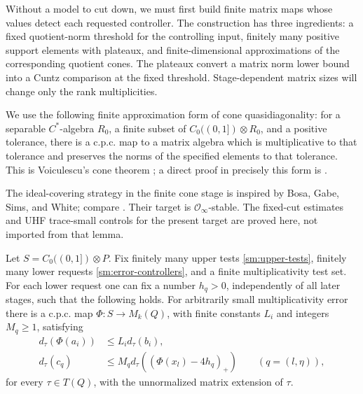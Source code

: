 Without a model to cut down, we must first build finite matrix maps
whose values detect each requested controller.  The construction has
three ingredients: a fixed quotient-norm threshold for the controlling
input, finitely many positive support elements with plateaux, and
finite-dimensional approximations of the corresponding quotient cones.
The plateaux convert a matrix norm lower bound into a Cuntz comparison
at the fixed threshold.  Stage-dependent matrix sizes will change only
the rank multiplicities.

We use the following finite approximation form of cone
quasidiagonality: for a separable \(C^*\)-algebra \(R_0\), a finite
subset of \(C_0((0,1])\otimes R_0\), and a positive tolerance,
there is a c.p.c. map to a matrix algebra which is
multiplicative to that tolerance and preserves the norms of
the specified elements to that tolerance.  This is
Voiculescu's cone theorem \cite{Voiculescu}; a direct proof in precisely this
form is \cite[Proposition~33]{Shulman}.

The ideal-covering strategy in the finite cone stage is inspired by
Bosa, Gabe, Sims, and White; compare \cite[Lemma~3.5]{BGSW}.
Their target is \(\mathcal O_\infty\)-stable.  The fixed-cut estimates
and UHF trace-small controls for the present target are proved here,
not imported from that lemma.

\begin{lemma}\label{sm:cone-stage}
Let \(S=C_0((0,1])\otimes P\).  Fix finitely many upper
tests \eqref{sm:upper-tests}, finitely many lower requests
\eqref{sm:error-controllers}, and a finite multiplicativity
test set.  For each lower request one can fix a number
\(h_q>0\), independently of all later stages, such that the
following holds.
For arbitrarily small multiplicativity error there is a
c.p.c. map \(\Phi:S\to M_k(Q)\), with finite constants
\(L_i\) and integers \(M_q\geq1\), satisfying
\begin{equation}\label{sm:stage-bounds}
 \begin{split}
 d_\tau(\Phi(a_i))&\leq L_i d_\tau(b_i),\\
 d_\tau(c_q)&\leq
 M_q d_\tau((\Phi(x_l)-4h_q)_+)
 \qquad(q=(l,\eta)),
 \end{split}
\end{equation}
for every \(\tau\in T(Q)\), with the unnormalized matrix
extension of \(\tau\).
\end{lemma}

